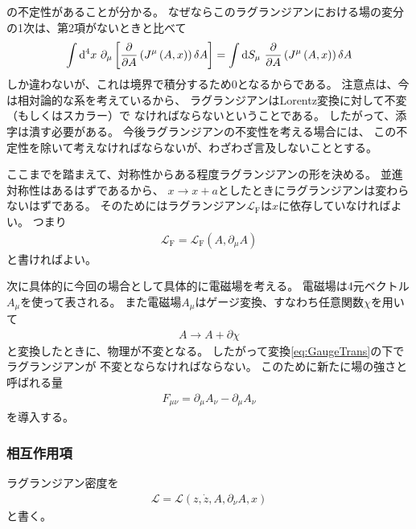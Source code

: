 \documentclass[a4paper, 10pt]{jsarticle}
\theoremstyle{definition}
\newcommand{\pdif}[2]{\frac{\partial #1}{\partial #2}}
\newcommand{\ddif}{{\rm d}}
\begin{document}
の不定性があることが分かる。
なぜならこのラグランジアンにおける場の変分の1次は、第2項がないときと比べて
\begin{align}
	\int \ddif^4 x \ \partial_\mu \left[ \pdif{}{A} \left( J^\mu
	\left( A, x \right) \right) \delta A \right]
	= \int \ddif S_\mu \ \pdif{}{A} \left( J^\mu \left( A, x \right)
	\right) \delta A
\end{align}
しか違わないが、これは境界で積分するため0となるからである。
注意点は、今は相対論的な系を考えているから、
ラグランジアンはLorentz変換に対して不変（もしくはスカラー）で
なければならないということである。
したがって、添字は潰す必要がある。
今後ラグランジアンの不変性を考える場合には、
この不定性を除いて考えなければならないが、わざわざ言及しないこととする。

ここまでを踏まえて、対称性からある程度ラグランジアンの形を決める。
並進対称性はあるはずであるから、
$x \to x + a$としたときにラグランジアンは変わらないはずである。
そのためにはラグランジアン$\mathcal{L}_\textrm{F}$は$x$に依存していなければよい。
つまり
\begin{align}
	\mathcal{L}_\textrm{F} = \mathcal{L}_\textrm{F} \left(
		A, \partial_\mu A
	\right)
\end{align}
と書ければよい。

次に具体的に今回の場合として具体的に電磁場を考える。
電磁場は4元ベクトル$A_\mu$を使って表される。
また電磁場$A_\mu$はゲージ変換、すなわち任意関数$\chi$を用いて
\begin{align}
	A \to A + \partial \chi
	\label{eq:GaugeTrans}
\end{align}
と変換したときに、物理が不変となる。
したがって変換\eqref{eq:GaugeTrans}の下でラグランジアンが
不変とならなければならない。
このために新たに場の強さと呼ばれる量
\begin{align}
	F_{\mu \nu} = \partial_\mu A_\nu - \partial_\mu A_\nu
\end{align}
を導入する。

\subsubsection{相互作用項}
ラグランジアン密度を
\begin{align}
	\mathcal{L} =
	\mathcal{L} \left( z, \dot{z}, A, \partial_\nu A, x \right)
\end{align}
と書く。
\end{document}
